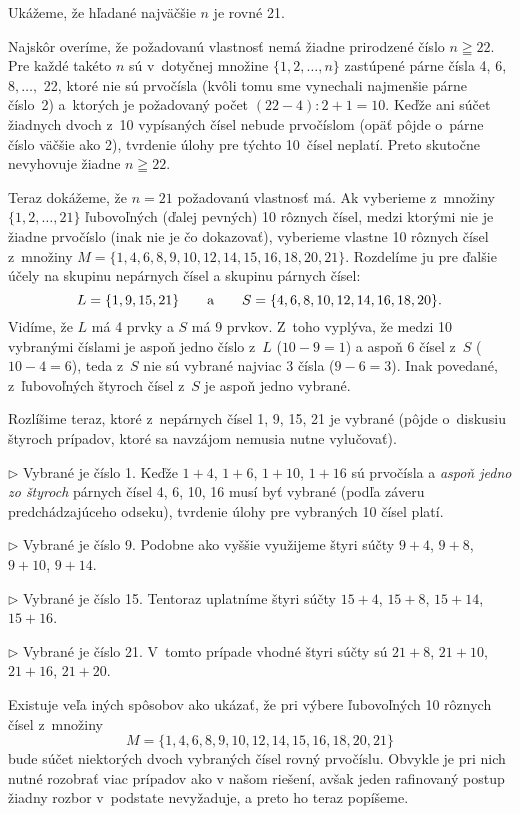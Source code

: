 {%
Ukážeme, že hľadané najväčšie $n$ je rovné 21.

Najskôr overíme, že požadovanú vlastnosť nemá žiadne
prirodzené číslo $n\geqq22$. Pre každé takéto $n$ sú v~dotyčnej
množine $\{1,2,\dots, n\}$ zastúpené párne čísla 4, 6, $8, \dots,$ 22,
ktoré nie sú prvočísla (kvôli tomu sme vynechali najmenšie párne
číslo~2) a~ktorých je požadovaný počet $(22-4):2+1=10$. Keďže ani
súčet žiadnych dvoch z~10 vypísaných čísel nebude prvočíslom
(opäť pôjde o~párne číslo väčšie ako 2), tvrdenie úlohy pre týchto
10~čísel neplatí. Preto skutočne nevyhovuje žiadne $n\geqq22$.

Teraz dokážeme, že $n=21$ požadovanú vlastnosť má. Ak vyberieme
z~množiny $\{1,2,\dots, 21\}$ ľubovoľných (ďalej pevných)
10 rôznych čísel, medzi
ktorými nie je žiadne prvočíslo (inak nie je čo dokazovať), vyberieme
vlastne 10 rôznych čísel z~množiny $M=\{1,4,6,8,9,10,12,14,15,16,18,20,21\}$.
Rozdelíme ju pre ďalšie účely na skupinu nepárnych čísel a skupinu párnych čísel:
$$
L=\{1,9,15,21\}\qquad\hbox{a}\qquad
S=\{4,6,8,10,12,14,16,18,20\}.
$$
Vidíme, že $L$ má 4 prvky a $S$ má 9 prvkov. Z~toho vyplýva, že medzi
10 vybranými číslami je aspoň jedno číslo z~$L$ ($10-9=1$) a aspoň 6 čísel
z~$S$ ($10-4=6$), teda z~$S$ nie sú vybrané najviac 3 čísla ($9-6=3$).
Inak povedané, z~ľubovoľných štyroch čísel z~$S$ je aspoň jedno vybrané.

Rozlíšime teraz, ktoré z~nepárnych čísel 1, 9, 15, 21
je vybrané (pôjde o~diskusiu štyroch prípadov, ktoré sa navzájom
nemusia nutne vylučovať).
\item{$\triangleright$}
Vybrané je číslo 1. Keďže $1+4$, $1+6$, $1+10$, $1+16$
sú prvočísla a {\it aspoň jedno zo štyroch\/} párnych čísel 4, 6, 10, 16
musí byť vybrané (podľa záveru predchádzajúceho odseku),
tvrdenie úlohy pre vybraných 10 čísel platí.
\item{$\triangleright$}
Vybrané je číslo 9. Podobne ako vyššie využijeme štyri súčty
$9+4$, $9+8$, $9+10$, $9+14$.
\item{$\triangleright$}
Vybrané je číslo 15. Tentoraz uplatníme štyri súčty $15+4$, $15+8$,
$15+14$, $15+16$.
\item{$\triangleright$}
Vybrané je číslo 21. V~tomto prípade vhodné štyri súčty sú
$21+8$, $21+10$, $21+16$, $21+20$.

\poznamka
Existuje veľa iných spôsobov ako ukázať, že pri výbere
ľubovoľných 10 rôznych čísel z~množiny
$$
M=\{1,4,6,8,9,10,12,14,15,16,18,20,21\}
$$
bude súčet niektorých dvoch vybraných čísel rovný prvočíslu.
Obvykle je pri nich nutné rozobrať viac prípadov ako v našom riešení,
avšak jeden rafinovaný postup žiadny rozbor v~podstate nevyžaduje,
a preto ho teraz popíšeme.

}
